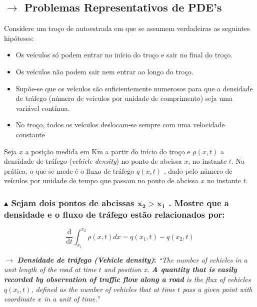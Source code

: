 \label{sec:SistemasDis}
\subsection[6.1 Problemas Representativos de PDE's]{$\rightarrow$ Problemas Representativos de PDE's}
Considere um troço de autoestrada em que se assumem verdadeiras as seguintes hipóteses:

\begin{itemize}
    \item[\ding{43}] Os veículos só podem entrar no início do troço e sair no final do troço.
    \item[\ding{43}] Os veículos não podem sair nem entrar ao longo do troço.
    \item[\ding{43}] Supõe-se que os veículos são suficientemente numerosos para que a densidade de tráfego (número de veículos por unidade de comprimento) seja uma variável contínua.
    \item[\ding{43}] No troço, todos os veículos deslocam-se sempre com uma velocidade constante
\end{itemize}

\noindent Seja $x$ a posição medida em Km a partir do início do troço e $\rho (x,t)$ a densidade de
tráfego (\textit{vehicle density}) no ponto de abcissa $x$, no instante $t$. Na prática, o que se mede é o fluxo de
tráfego $q(x,t)$ , dado pelo número de veículos por unidade de tempo que passam no
ponto de abcissa $x$ no instante $t$.


\subsubsection*{$\blacktriangle$ Sejam dois pontos de abcissas $\mathbf{x_2 > x_1}$ . Mostre que a densidade e o fluxo de
tráfego estão relacionados por:}

$$
\frac{\mathrm{d}}{\mathrm{d}t}\int_{x_1}^{x_2}\rho (x,t)dx = q(x_1,t) - q(x_2,t)
$$

\begin{mdframed}
    \noindent $\pmb{\rightarrow}$ \textbf{\textit{Densidade de tráfego (Vehicle density)}:}
     \textit{``The number of vehicles in a unit length of the road at time $t$ and position x. \textbf{A quantity that is easily recorded by observation of traffic flow along a road} is the flux of vehicles $q(x_i,t)$, defined as the number of vehicles that at time $t$ pass a given point with coordinate $x$ in a unit of time.''}
\end{mdframed}

